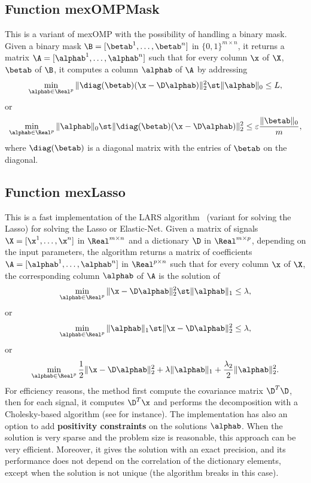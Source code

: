 \documentclass[a4paper, 11pt]{article}
\begin{document}
\subsection{Function mexOMPMask}
This is a variant of mexOMP with the possibility of handling a binary mask. 
Given a binary mask $\B=[\betab^1,\ldots,\betab^n]$ in $\{0,1\}^{m \times n}$, it returns a matrix $\A=[\alphab^1,\ldots,\alphab^n]$ such that for every column $\x$ of $\X$, $\betab$ of $\B$, it computes a column $\alphab$ of $\A$ by addressing
\begin{equation}
    \min_{\alphab \in \Real^p} \|\diag(\betab)(\x-\D\alphab)\|_2^2 \st \|\alphab\|_0 \leq L,
\end{equation}
or 
\begin{equation}
   \min_{\alphab \in \Real^p}  \|\alphab\|_0 \st \|\diag(\betab)(\x-\D\alphab)\|_2^2 \leq \varepsilon\frac{\|\betab\|_0}{m},
\end{equation}
where $\diag(\betab)$ is a diagonal matrix with the entries of $\betab$ on the diagonal.

{\footnotesize

}


\subsection{Function mexLasso}
This is a fast implementation of the LARS algorithm~\cite{efron} (variant for solving the Lasso) for solving the Lasso or Elastic-Net. Given a matrix of signals $\X=[\x^1,\ldots,\x^n]$  in $\Real^{m \times n}$ and a dictionary $\D$ in $\Real^{m \times p}$, depending on the input parameters, the algorithm returns a matrix of coefficients $\A=[\alphab^1,\ldots,\alphab^n]$ in $\Real^{p \times n}$ such that for every column $\x$ of $\X$, the corresponding column $\alphab$ of $\A$ is the solution of
\begin{equation}
   \min_{\alphab \in \Real^p} \|\x-\D\alphab\|_2^2 \st \|\alphab\|_1 \leq \lambda,
\end{equation}
or 
\begin{equation}
   \min_{\alphab \in \Real^p}  \|\alphab\|_1 \st \|\x-\D\alphab\|_2^2 \leq \lambda, \label{eq:lasso2}
\end{equation}
or
\begin{equation}
   \min_{\alphab \in \Real^p} \frac{1}{2}\|\x-\D\alphab\|_2^2 + \lambda \|\alphab\|_1 + \frac{\lambda_2}{2}\|\alphab\|_2^2. \label{eq:lasso}
\end{equation}
For efficiency reasons, the method first compute the covariance matrix $\D^T\D$, then
for each signal, it computes $\D^T\x$ and performs the decomposition with a
Cholesky-based algorithm (see \cite{efron} for instance).  The implementation
has also an option to add {\bf positivity constraints} on the solutions
$\alphab$.  When the solution is very sparse and the problem size is
reasonable, this approach can be very efficient. Moreover, it gives the
solution with an exact precision, and its performance does not depend on the
correlation of the dictionary elements, except when the solution is not unique
(the algorithm breaks in this case).
\end{document}
